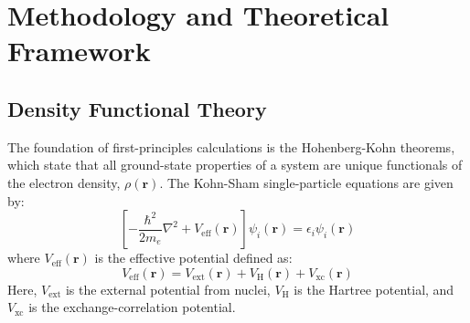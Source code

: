%
%

\chapter{Methodology and Theoretical Framework}
\label{ch:methodology}

\section{Density Functional Theory}
The foundation of first-principles calculations is the Hohenberg-Kohn theorems, which state that all ground-state properties of a system are unique functionals of the electron density, $\rho(\mathbf{r})$. The Kohn-Sham single-particle equations are given by:
\begin{equation}
    \left[ -\frac{\hbar^2}{2m_e}\nabla^2 + V_{\text{eff}}(\mathbf{r}) \right] \psi_i(\mathbf{r}) = \epsilon_i \psi_i(\mathbf{r})
    \label{eq:kohn_sham}
\end{equation}
where $V_{\text{eff}}(\mathbf{r})$ is the effective potential defined as:
\begin{equation}
    V_{\text{eff}}(\mathbf{r}) = V_{\text{ext}}(\mathbf{r}) + V_{\text{H}}(\mathbf{r}) + V_{\text{xc}}(\mathbf{r})
    \label{eq:v_eff}
\end{equation}
Here, $V_{\text{ext}}$ is the external potential from nuclei, $V_{\text{H}}$ is the Hartree potential, and $V_{\text{xc}}$ is the exchange-correlation potential.

